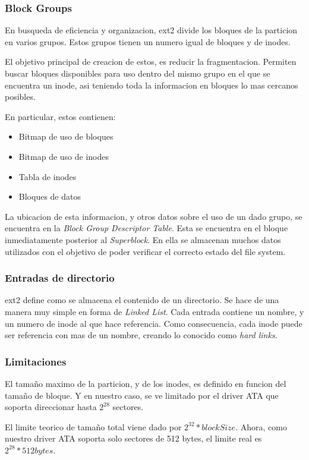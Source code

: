 \documentclass[a4paper,10pt]{article}
\begin{document}
\subsubsection{Block Groups}
En busqueda de eficiencia y organizacion, ext2 divide los bloques de la particion en varios grupos.
Estos grupos tienen un numero igual de bloques y de inodes.

El objetivo principal de creacion de estos, es reducir la fragmentacion. 
Permiten buscar bloques disponibles para uso dentro del mismo grupo en el que se encuentra un inode, asi teniendo toda la informacion en bloques lo mas cercanos posibles.

En particular, estos contienen:
\begin{itemize}
\item Bitmap de uso de bloques
\item Bitmap de uso de inodes
\item Tabla de inodes
\item Bloques de datos
\end{itemize}

La ubicacion de esta informacion, y otros datos sobre el uso de un dado grupo, se encuentra en la \textit{Block Group Descriptor Table}.
Esta se encuentra en el bloque inmediatamente posterior al \textit{Superblock}.
En ella se almacenan muchos datos utilizados con el objetivo de poder verificar el correcto estado del file system.

\subsubsection{Entradas de directorio}
ext2 define como se almacena el contenido de un directorio.
Se hace de una manera muy simple en forma de \textit{Linked List}.
Cada entrada contiene un nombre, y un numero de inode al que hace referencia.
Como consecuencia, cada inode puede ser referencia con mas de un nombre, creando lo conocido como \textit{hard links}.

\subsubsection{Limitaciones}
El tamaño maximo de la particion, y de los inodes, es definido en funcion del tamaño de bloque.
Y en nuestro caso, se ve limitado por el driver ATA que soporta direccionar hasta $ 2^{28} $ sectores.

El limite teorico de tamaño total viene dado por $ 2^{32} * blockSize $.
Ahora, como nuestro driver ATA soporta solo sectores de 512 bytes, el limite real es $ 2^{28} * 512 bytes $.
\end{document}

